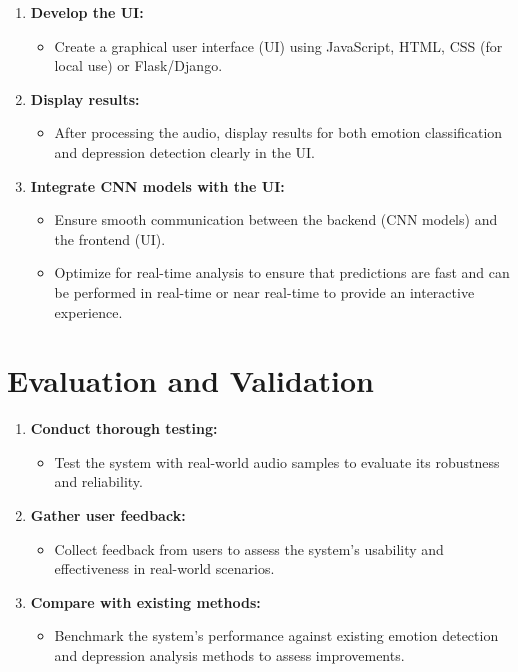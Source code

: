 \begin{enumerate}
    \item \textbf{Develop the UI:}
    \begin{itemize}
        \item Create a graphical user interface (UI) using JavaScript, HTML, CSS (for local use) or Flask/Django.
    \end{itemize}
    \item \textbf{Display results:}
    \begin{itemize}
        \item After processing the audio, display results for both emotion classification and depression detection clearly in the UI.
    \end{itemize}
    \item \textbf{Integrate CNN models with the UI:}
    \begin{itemize}
        \item Ensure smooth communication between the backend (CNN models) and the frontend (UI).
        \item Optimize for real-time analysis to ensure that predictions are fast and can be performed in real-time or near real-time to provide an interactive experience.
    \end{itemize}
\end{enumerate}

\section{Evaluation and Validation}

\begin{enumerate}
    \item \textbf{Conduct thorough testing:}
    \begin{itemize}
        \item Test the system with real-world audio samples to evaluate its robustness and reliability.
    \end{itemize}
    \item \textbf{Gather user feedback:}
    \begin{itemize}
        \item Collect feedback from users to assess the system's usability and effectiveness in real-world scenarios.
    \end{itemize}
    \item \textbf{Compare with existing methods:}
    \begin{itemize}
        \item Benchmark the system's performance against existing emotion detection and depression analysis methods to assess improvements.
    \end{itemize}
\end{enumerate}

